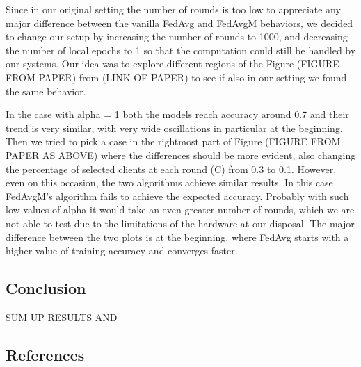 \documentclass[twocolumn]{article}
\begin{document}
Since in our original setting the number of rounds is too low to appreciate any major difference between the vanilla FedAvg and FedAvgM behaviors, we decided to change our setup by increasing the number of rounds to 1000, and decreasing the number of local epochs to 1 so that the computation could still be handled by our systems.
Our idea was to explore different regions of the Figure (FIGURE FROM PAPER) from (LINK OF PAPER) to see if also in our setting we found the same behavior.

In the case with alpha = 1 both the models reach accuracy around 0.7 and their trend is very similar, with very wide oscillations in particular at the beginning.
Then we tried to pick a case in the rightmost part of Figure (FIGURE FROM PAPER AS ABOVE) where the differences should be more evident, also changing the percentage of selected clients at each round (C) from 0.3 to 0.1. 
However, even on this occasion, the two algorithms achieve similar results. In this case FedAvgM's algorithm fails to achieve the expected accuracy. Probably with such low values of alpha it would take an even greater number of rounds, which we are not able to test due to the limitations of the hardware at our disposal. The major difference between the two plots is at the beginning, where FedAvg starts with a higher value of training accuracy and converges faster.



\subsection{Conclusion}
SUM UP RESULTS AND 
\subsection{References}
\end{document}

